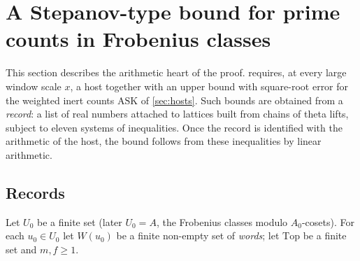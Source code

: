 \section{A Stepanov-type bound for prime counts in Frobenius classes}\label{sec:stepanov}

This section describes the arithmetic heart of the proof.  requires, at every
large window scale $x$, a host together with an upper bound with square-root error for the weighted
inert counts $\mathrm{ASK}$ of \cref{sec:hosts}. Such bounds are obtained from a \emph{record}: a list of
real numbers attached to lattices built from chains of theta lifts, subject to eleven systems of
inequalities. Once the record is identified with the arithmetic of the host, the bound follows from
these inequalities by linear arithmetic.

\subsection{Records}

Let $U_0$ be a finite set (later $U_0=A$, the Frobenius classes modulo $A_0$-cosets). For each $u_0\in U_0$
let $W(u_0)$ be a finite non-empty set of \emph{words}; let $\mathrm{Top}$ be a finite set and $m,f\ge1$.

